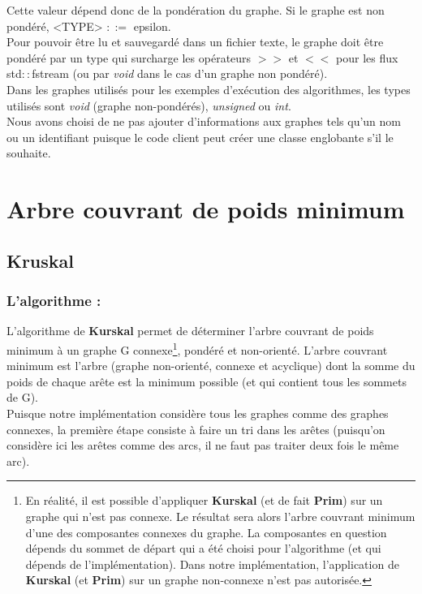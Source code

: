 \documentclass[12pt]{article}
\begin{document}
Cette valeur dépend donc de la pondération du graphe. Si le graphe est non pondéré, <TYPE> $::=$ epsilon. \\ 

Pour pouvoir être lu et sauvegardé dans un fichier texte, le graphe doit être pondéré par un type qui surcharge les opérateurs $>>$ et $<<$ pour les flux std$::$fstream (ou par {\it void} dans le cas d'un graphe non pondéré).\\ 

Dans les graphes utilisés pour les exemples d'exécution des algorithmes, les types utilisés sont {\it void} (graphe non-pondérés), {\it unsigned} ou {\it int}.\\ 

Nous avons choisi de ne pas ajouter d'informations aux graphes tels qu'un nom ou un identifiant puisque le code client peut créer une classe englobante s'il le souhaite.\\ 

\clearpage
\section{Arbre couvrant de poids minimum}

\subsection{Kruskal}
\subsubsection{L'algorithme :}

L'algorithme de {\bf Kurskal} permet de déterminer l'arbre couvrant de poids minimum à un graphe G connexe\footnote{En réalité, il est possible d'appliquer {\bf Kurskal} (et de fait {\bf Prim}) sur un graphe qui n'est pas connexe. Le résultat sera alors l'arbre couvrant minimum d'une des composantes connexes du graphe. La composantes en question dépends du sommet de départ qui a été choisi pour l'algorithme (et qui dépends de l'implémentation).
Dans notre implémentation, l'application de {\bf Kurskal} (et {\bf Prim}) sur un graphe non-connexe n'est pas autorisée.
}, pondéré et non-orienté. L'arbre couvrant minimum est l'arbre (graphe non-orienté, connexe et acyclique) dont la somme du poids de chaque arête est la minimum possible (et qui contient tous les sommets de G). \\ 

Puisque notre implémentation considère tous les graphes comme des graphes connexes, la première étape consiste à faire un tri dans les arêtes (puisqu'on considère ici les arêtes comme des arcs, il ne faut pas traiter deux fois le même arc). \\ 
\end{document}
